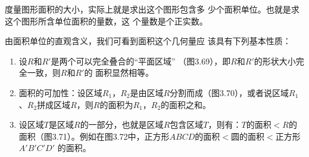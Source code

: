 \begin{figure}
    \centering
{}
    \caption{}
\end{figure}

度量图形面积的大小，实际上就是求出这个图形包含多
少个面积单位。也就是求这个图形所含单位面积的量数，这
个量数是个正实数。

由面积单位的直观含义，我们可看到面积这个几何量应
该具有下列基本性质：
\begin{enumerate}
\item 设$R$和$R'$是两个可以完全叠合的“平面区域”
（图3.69），即$R$和$R'$的形状大小完全一致，则$R$和$R'$的
面积显然相等。
\begin{figure}
    \centering
    \caption{}
\end{figure}
\begin{figure}
    \centering
    \caption{}
\end{figure}
\item 面积的可加性：设区域$R_1$，$R_2$是由区域$R$分割而成（图3.70），或者说区域$R_1$、$R_2$拼成区域$R$，则$R$的面积为$R_1$，$R_2$的面积之和。
\item 设区域$T$是区域$R$的一部分，也就是区域$R$包含区域$T$，则有：$T$的面积$<R$的面积（图3.71）。例如在图3.72中，正方形$ABCD$的面积$<$圆的面积$<$正方形$A'B'C'D'$
的面积。
\end{enumerate}

\begin{figure}
    \begin{minipage}[t]{0.48\linewidth}
    \centering
    \caption{}
    \end{minipage}
    \begin{minipage}[t]{0.48\linewidth}
    \centering
    \begin{tikzpicture}[>=latex, scale=1]
    \end{tikzpicture}
    \caption{}
    \end{minipage}
    \end{figure}


